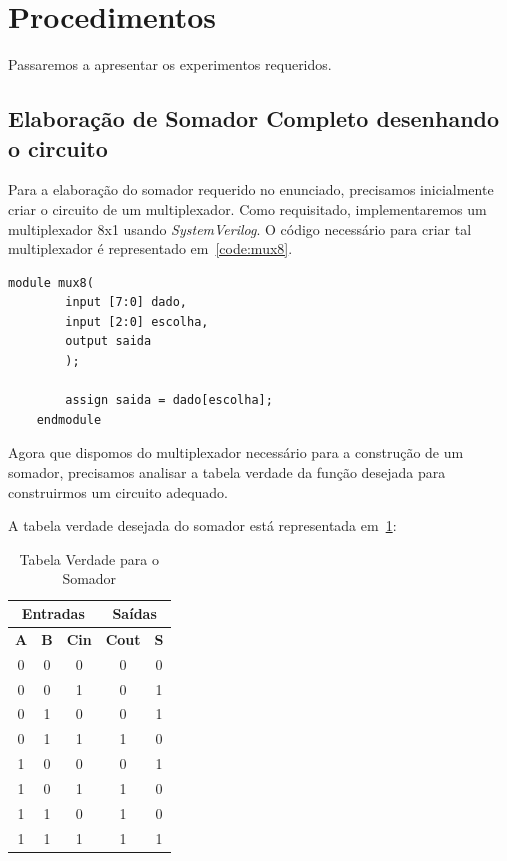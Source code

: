 \documentclass[12pt]{article}
\begin{document}
\section{Procedimentos}
\label{sec:Procedimentos}

Passaremos a apresentar os experimentos requeridos.

\subsection{Elaboração de Somador Completo desenhando o circuito}\label{sec:2.1}

Para a elaboração do somador requerido no enunciado, precisamos inicialmente
criar o circuito de um multiplexador. Como requisitado, implementaremos um
multiplexador 8x1 usando \emph{SystemVerilog}. O código necessário para criar
tal multiplexador é representado em~\ref{code:mux8}.

\begin{center}
    \begin{lstlisting}[style={verilog-style}]
    module mux8(
        input [7:0] dado,
        input [2:0] escolha,
        output saida
        );

        assign saida = dado[escolha];
    endmodule
    \end{lstlisting}
    \label{code:mux8}
\end{center}

Agora que dispomos do multiplexador necessário para a construção de um somador,
precisamos analisar a tabela verdade da função desejada para construirmos um
circuito adequado.

A tabela verdade desejada do somador está representada
em~\ref{tab:truth_table_full_adder}:

\begin{table}[H]
    \centering
    \caption{Tabela Verdade para o Somador}
    \begin{tabular}{|c|c|c||c|c|}\hline
    \multicolumn{3}{|c||}{Entradas} & \multicolumn{2}{|c|}{Saídas} \\\hline
    \textbf{A} & \textbf{B} & \textbf{Cin} & \textbf{Cout} & \textbf{S} \\\hline
    0 & 0 & 0 & 0 & 0 \\\hline
    0 & 0 & 1 & 0 & 1 \\\hline
    0 & 1 & 0 & 0 & 1 \\\hline
    0 & 1 & 1 & 1 & 0 \\\hline
    1 & 0 & 0 & 0 & 1 \\\hline
    1 & 0 & 1 & 1 & 0 \\\hline
    1 & 1 & 0 & 1 & 0 \\\hline
    1 & 1 & 1 & 1 & 1 \\\hline
    \end{tabular}\label{tab:truth_table_full_adder}
\end{table}
\end{document}

